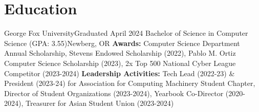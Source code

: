 
\section{Education}
\resumeSubHeadingListStart
    \resumeEducationSubheading
        {George Fox University}{Graduated April 2024}
        {Bachelor of Science in Computer Science (GPA: 3.55)}{Newberg, OR}
        {\textbf{Awards:} Computer Science Department Annual Scholarship, Stevens Endowed Scholarship (2022), Pablo M. Ortiz Computer Science Scholarship (2023), 2x Top 500 National Cyber League Competitor (2023-2024)}
        {\textbf{Leadership Activities:} Tech Lead (2022-23) \& President (2023-24) for Association for Computing Machinery Student Chapter, Director of Student Organizations (2023-2024), Yearbook Co-Director (2020-2024), Treasurer for Asian Student Union (2023-2024)}


\resumeSubHeadingListEnd


